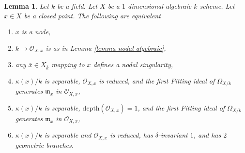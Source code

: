 \documentclass{amsart}
\theoremstyle{plain}
\newtheorem{lemma}[subsection]{Lemma}
\theoremstyle{definition}
\theoremstyle{remark}
\numberwithin{equation}{subsection}
\begin{document}
\begin{lemma}
\label{lemma-nodal}
Let $k$ be a field. Let $X$ be a $1$-dimensional algebraic $k$-scheme.
Let $x \in X$ be a closed point. The following are equivalent
\begin{enumerate}
\item $x$ is a node,
\item $k \to \mathcal{O}_{X, x}$ is as in Lemma \ref{lemma-nodal-algebraic},
\item any $\overline{x} \in X_{\overline{k}}$ mapping to $x$ defines
a nodal singularity,
\item $\kappa(x)/k$ is separable, $\mathcal{O}_{X, x}$ is reduced, and
the first Fitting ideal of $\Omega_{X/k}$ generates $\mathfrak m_x$
in $\mathcal{O}_{X, x}$,
\item $\kappa(x)/k$ is separable, $\text{depth}(\mathcal{O}_{X, x}) = 1$, and
the first Fitting ideal of $\Omega_{X/k}$ generates $\mathfrak m_x$
in $\mathcal{O}_{X, x}$,
\item $\kappa(x)/k$ is separable and $\mathcal{O}_{X, x}$ is reduced, has
$\delta$-invariant $1$, and has $2$ geometric branches.
\end{enumerate}
\end{lemma}
\end{document}
